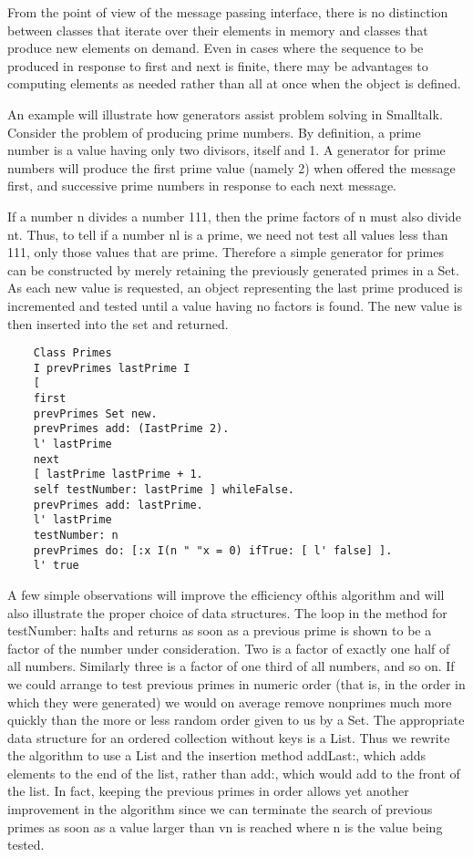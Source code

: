From the point of view of the message passing interface, there is no distinction
between classes that iterate over their elements in memory and classes that
produce new elements on demand. Even in cases where the sequence to be produced
in response to first and next is finite, there may be advantages to computing
elements as needed rather than all at once when the object is defined.

An example will illustrate how generators assist problem solving in Smalltalk.
Consider the problem of producing prime numbers. By definition, a prime number
is a value having only two divisors, itself and 1. A generator for prime numbers
will produce the first prime value (namely 2) when offered the message first,
and successive prime numbers in response to each next message.

If a number n divides a number 111, then the prime factors of n must also divide
nt. Thus, to tell if a number nl is a prime, we need not test all values less
than 111, only those values that are prime. Therefore a simple generator for
primes can be constructed by merely retaining the previously generated primes in
a Set. As each new value is requested, an object representing the last prime
produced is incremented and tested until a value having no factors is found. The
new value is then inserted into the set and returned.

\begin{lstlisting}
    Class Primes
    I prevPrimes lastPrime I
    [
    first
    prevPrimes Set new.
    prevPrimes add: (IastPrime 2).
    l' lastPrime
    next
    [ lastPrime lastPrime + 1.
    self testNumber: lastPrime ] whileFalse.
    prevPrimes add: lastPrime.
    l' lastPrime
    testNumber: n
    prevPrimes do: [:x I(n " "x = 0) ifTrue: [ l' false] ].
    l' true    
\end{lstlisting}

A few simple observations will improve the efficiency ofthis algorithm and will
also illustrate the proper choice of data structures. The loop in the method for
testNumber: haIts and returns as soon as a previous prime is shown to be a
factor of the number under consideration. Two is a factor of exactly one half of
all numbers. Similarly three is a factor of one third of all numbers, and so on.
If we could arrange to test previous primes in numeric order (that is, in the
order in which they were generated) we would on average remove nonprimes much
more quickly than the more or less random order given to us by a Set. The
appropriate data structure for an ordered collection without keys is a List.
Thus we rewrite the algorithm to use a List and the insertion method addLast:,
which adds elements to the end of the list, rather than add:, which would add to
the front of the list. In fact, keeping the previous primes in order allows yet
another improvement in the algorithm since we can terminate the search of
previous primes as soon as a value larger than vn is reached where n is the
value being tested.

